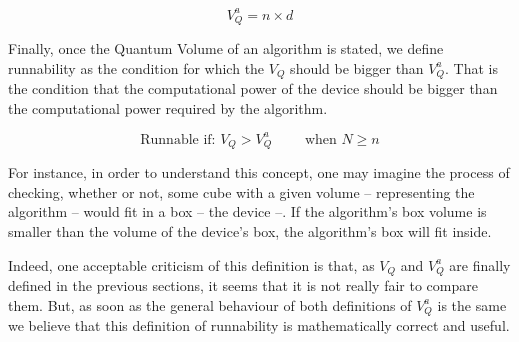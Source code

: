 \begin{equation}
\label{eq:org6aba4aa}
V_Q^a =  n \times d
\end{equation}

Finally, once the Quantum Volume of an algorithm is stated, we define runnability as the condition for which the \(V_Q\) should be bigger than \(V^a_Q\).
That is the condition that the computational power of the device should be bigger than the computational power required by the algorithm.

$$\text{Runnable if: } V_Q > V^a_Q \quad \quad \text{ when } N \ge n$$

For instance, in order to understand this concept, one may imagine the process of checking, whether or not, some cube with a given volume -- representing the algorithm -- would fit in a box -- the device --.
If the algorithm's box volume is smaller than the volume of the device's box, the algorithm's box will fit inside.

Indeed, one acceptable criticism of this definition is that, as \(V_Q\) and \(V^a_Q\) are finally defined in the previous sections, it seems that it is not really fair to compare them.
But, as soon as the general behaviour of both definitions of \(V^a_Q\) is the same we believe that this definition of runnability is mathematically correct and useful.

